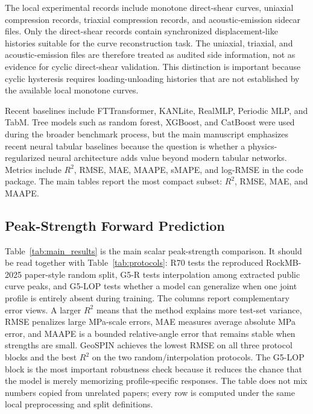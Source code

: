 \documentclass[journal]{IEEEtran}
\begin{document}
The local experimental records include monotone direct-shear curves, uniaxial compression records, triaxial compression records, and acoustic-emission sidecar files. Only the direct-shear records contain synchronized displacement-like histories suitable for the curve reconstruction task. The uniaxial, triaxial, and acoustic-emission files are therefore treated as audited side information, not as evidence for cyclic direct-shear validation. This distinction is important because cyclic hysteresis requires loading-unloading histories that are not established by the available local monotone curves.

Recent baselines include FTTransformer, KANLite, RealMLP, Periodic MLP, and TabM. Tree models such as random forest, XGBoost, and CatBoost were used during the broader benchmark process, but the main manuscript emphasizes recent neural tabular baselines because the question is whether a physics-regularized neural architecture adds value beyond modern tabular networks. Metrics include $R^2$, RMSE, MAE, MAAPE, sMAPE, and log-RMSE in the code package. The main tables report the most compact subset: $R^2$, RMSE, MAE, and MAAPE.

\subsection{Peak-Strength Forward Prediction}


Table~\ref{tab:main_results} is the main scalar peak-strength comparison. It should be read together with Table~\ref{tab:protocols}: R70 tests the reproduced RockMB-2025 paper-style random split, G5-R tests interpolation among extracted public curve peaks, and G5-LOP tests whether a model can generalize when one joint profile is entirely absent during training. The columns report complementary error views. A larger $R^2$ means that the method explains more test-set variance, RMSE penalizes large MPa-scale errors, MAE measures average absolute MPa error, and MAAPE is a bounded relative-angle error that remains stable when strengths are small. GeoSPIN achieves the lowest RMSE on all three protocol blocks and the best $R^2$ on the two random/interpolation protocols. The G5-LOP block is the most important robustness check because it reduces the chance that the model is merely memorizing profile-specific responses. The table does not mix numbers copied from unrelated papers; every row is computed under the same local preprocessing and split definitions.
\end{document}
